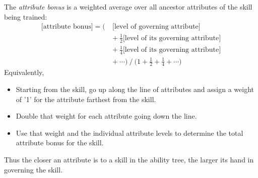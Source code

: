 \documentclass[12pt]{article}
\begin{document}
The \emph{attribute bonus} is a weighted average over all ancestor attributes of the skill being trained:
\begin{align*}
\textrm{[attribute bonus]}
=\big(\ &\textrm{[level of governing attribute]}\\
&+\ \frac{1}{2}\textrm{[level of its governing attribute]}\\
&+\ \frac{1}{4}\textrm{[level of its governing attribute]}\\
&+\ \cdots \big)
\ /\ \big(1+\frac{1}{2}+\frac{1}{4}+\cdots\big)
\end{align*}
Equivalently,
\vspace{-6mm}
\begin{itemize}
\item Starting from the skill, go up along the line of attributes
and assign a weight of '1' for the attribute farthest from the skill.
\item Double that weight for each attribute going down the line.
\item Use that weight and the individual attribute levels to determine the total attribute bonus for the skill.
\end{itemize}
\vspace{-6mm}
Thus the closer an attribute is to a skill in the ability tree, the larger its hand in governing the skill. 




\end{document}
